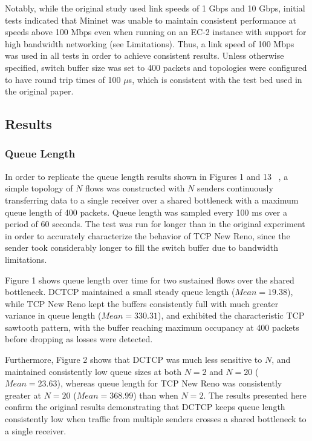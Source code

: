 Notably, while the original study used link speeds of 1 Gbps and 10 Gbps, initial tests indicated that Mininet was unable to maintain consistent performance at speeds above 100 Mbps even when running on an EC-2 instance with support for high bandwidth networking (see Limitations). Thus, a link speed of 100 Mbps was used in all tests in order to achieve consistent results. Unless otherwise specified, switch buffer size was set to 400 packets and topologies were configured to have round trip times of 100 $\mu$s, which is consistent with the test bed used in the original paper.

\subsection{Results}

\subsubsection{Queue Length}

In order to replicate the queue length results shown in Figures 1 and 13 ~\cite{alizadeh_data_2010}, a simple topology of $N$ flows was constructed with $N$ senders continuously transferring data to a single receiver over a shared bottleneck with a maximum queue length of 400 packets. Queue length was sampled every 100 ms over a period of 60 seconds. The test was run for longer than in the original experiment in order to accurately characterize the behavior of TCP New Reno, since the sender took considerably longer to fill the switch buffer due to bandwidth limitations. 

Figure 1 shows queue length over time for two sustained flows over the shared bottleneck. DCTCP maintained a small steady queue length ($Mean = 19.38$), while TCP New Reno kept the buffers consistently full with much greater variance in queue length ($Mean = 330.31$), and exhibited the characteristic TCP sawtooth pattern, with the buffer reaching maximum occupancy at 400 packets before dropping as losses were detected. 

Furthermore, Figure 2 shows that DCTCP was much less sensitive to $N$, and maintained consistently low queue sizes at both $N = 2$ and $N = 20$ ($Mean = 23.63$), whereas queue length for TCP New Reno was consistently greater at $N = 20$ ($Mean = 368.99$) than when $N = 2$. The results presented here confirm the original results demonstrating that DCTCP keeps queue length consistently low when traffic from multiple senders crosses a shared bottleneck to a single receiver.  

